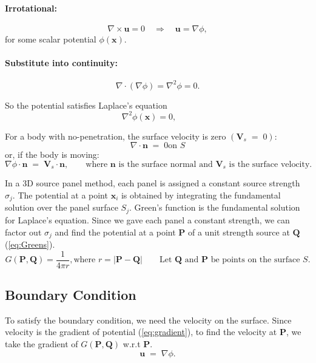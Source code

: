 \documentclass[conf]{new-aiaa} %
\begin{document}
\paragraph{Irrotational:}
\begin{equation}
\nabla \times \mathbf{u} = 0 
\quad \Rightarrow \quad 
\mathbf{u} = \nabla \phi,
\label{eq:irrotational}
\end{equation}
for some scalar potential $\phi(\mathbf{x})$.

\paragraph{Substitute into continuity:}
\begin{equation}
\nabla \cdot (\nabla \phi) = \nabla^2 \phi = 0.
\label{eq:laplace}
\end{equation}

So the potential satisfies Laplace’s equation
\begin{equation}
\nabla^2 \phi(\mathbf{x}) = 0, 
\qquad
\end{equation}

For a body with no-penetration, the surface velocity is zero $(\mathbf{V}_s \;=\; 0)$:
\[\nabla \cdot \mathbf{n} \;=\; 0 \text{on } S\]
or, if the body is moving: 
\begin{equation}
\nabla \phi \cdot \mathbf{n} 
\;=\; \mathbf{V}_s \cdot \mathbf{n},
\qquad \text{where $\mathbf{n}$ is the surface normal and $\mathbf{V}_s$ is the surface velocity.}
\label{eq:bc}
\end{equation}

In a 3D source panel method, each panel is assigned a constant source strength $\sigma_j$.
The potential at a point $\mathbf{x}_i$ is obtained by integrating the fundamental solution over the panel surface $S_j$.
Green's function is the fundamental solution for Laplace's equation.
Since we gave each panel a constant strength, we can factor out $\sigma_j$ and find the potential at a point $\mathbf{P}$ of a unit strength source at $\mathbf{Q}$ (\autoref{eq:Greens}).
\begin{equation}
	G(\mathbf{P},\mathbf{Q}) = \frac{1}{4\pi r}, \text{where } r = \lvert \mathbf{P} - \mathbf{Q} \rvert 
	\qquad 	\text{Let $\mathbf{Q}$ and $\mathbf{P}$ be points on the surface $S$.}
	\label{eq:Greens}
\end{equation}

\subsection{Boundary Condition}
To satisfy the boundary condition, we need the velocity on the surface. 
Since velocity is the gradient of potential (\autoref{eq:gradient}), to find the velocity at $\mathbf{P}$, we take the gradient of $G(\mathbf{P}, \mathbf{Q})$ w.r.t $\mathbf{P}$.
\begin{equation}
\mathbf{u} \;=\; \nabla \phi.
\label{eq:gradient}
\end{equation}
\end{document}
